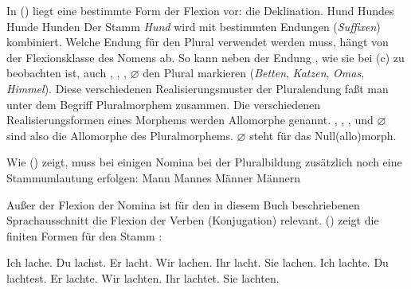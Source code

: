 In () liegt eine bestimmte Form der Flexion vor: die Deklination.
\eal
\ex Hund\label{bsp-hund-nom}
\ex Hundes\label{bsp-hund-gen}
\ex Hunde
\ex Hunden
\zl
Der Stamm \emph{Hund} wird mit bestimmten Endungen (\emph{Suffixen})
kombiniert. Welche Endung für den Plural verwendet werden muss, hängt von der Flexionsklasse
des Nomens ab. So kann neben der Endung , wie sie bei (c) zu beobachten ist, auch
, , , $\varnothing$ den Plural markieren (\emph{Betten},
\emph{Katzen}, \emph{Omas}, \emph{Himmel}). Diese verschiedenen Realisierungsmuster der Pluralendung
faßt man unter dem Begriff Pluralmorphem zusammen. Die verschiedenen Realisierungsformen eines
Morphems werden Allomorphe genannt. , , ,  und
$\varnothing$ sind also die Allomorphe des Pluralmorphems. $\varnothing$ steht für das Null(allo)morph.

Wie () zeigt, muss bei einigen Nomina bei der Pluralbildung zusätzlich noch eine Stammumlautung erfolgen:
\eal
\ex Mann\label{bsp-mann-nom}
\ex Mannes\label{bsp-mann-gen}
\ex Männer
\ex Männern
\zl


\noindent
Außer der Flexion der Nomina ist für den in diesem Buch beschriebenen Sprachausschnitt die 
Flexion der Verben (Konjugation) relevant. () zeigt die finiten Formen für
den Stamm :
\begin{multicols}{2}
\eal
\label{verb-konjugation-praesens}
\ex Ich lache.
\ex Du  lachst.
\ex Er  lacht.
\ex Wir lachen.
\ex Ihr lacht.
\ex Sie lachen.
\zl
\eal
\label{verb-konjugation-praeteritum}
\ex Ich lachte.
\ex Du  lachtest.
\ex Er  lachte.
\ex Wir lachten.
\ex Ihr lachtet.
\ex Sie lachten.
\zl
\end{multicols}

